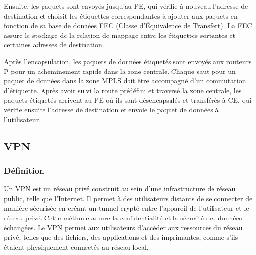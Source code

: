 Ensuite, les paquets sont envoyés jusqu'au PE, qui vérifie à nouveau l'adresse de destination et choisit les étiquettes correspondantes à ajouter aux paquets en fonction de sa base de données FEC (Classe d'Équivalence de Transfert). La FEC assure le stockage de la relation de mappage entre les étiquettes sortantes et certaines adresses de destination.
  
  Après l'encapsulation, les paquets de données étiquetés sont envoyés aux routeurs P pour un acheminement rapide dans la zone centrale. Chaque saut pour un paquet de données dans la zone MPLS doit être accompagné d'un commutation d'étiquette. Après avoir suivi la route prédéfini et traversé la zone centrale, les paquets étiquetés arrivent au PE où ils sont désencapsulés et transférés à CE, qui vérifie ensuite l'adresse de destination et envoie le paquet de données à l'utilisateur.
  \subsection{VPN}
  \subsubsection{Définition }
  Un VPN est un réseau privé construit au sein d'une infrastructure de réseau public, telle que l'Internet. Il permet à des utilisateurs distants de se connecter de manière sécurisée en créant un tunnel crypté entre l'appareil de l'utilisateur et le réseau privé. Cette méthode assure la confidentialité et la sécurité des données échangées. Le VPN permet aux utilisateurs d'accéder aux ressources du réseau privé, telles que des fichiers, des applications et des imprimantes, comme s'ils étaient physiquement connectés au réseau local.      
  
